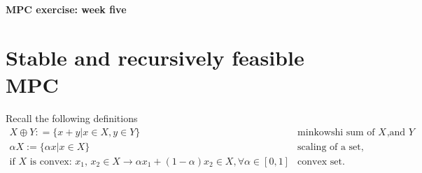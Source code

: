\newpage
\begin{center}
\normalfont\Large\bfseries MPC exercise: week five
\end{center}
\setcounter{section}{0}
\section{Stable and recursively feasible MPC}
Recall the following definitions
\begin{align*}
    X\oplus Y : = \{x+y|x\in X, y \in Y\} \quad&\text{minkowshi sum of $X$ and $Y$},\\
    \alpha X := \{\alpha x|x \in X\} \quad &\text{scaling of a set},\\
    \text{if $X$ is convex: $x_1$, $x_2\in X\rightarrow \alpha x_1+(1-\alpha)x_2\in X, \forall \alpha\in[0,1]$}\quad &\text{convex set}.
\end{align*}
